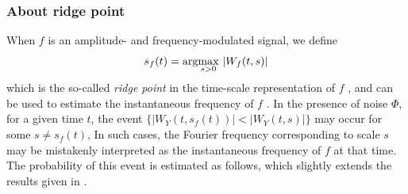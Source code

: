 \documentclass{amsart}
\begin{document}
\subsubsection{About ridge point}
When $f$ is an amplitude- and frequency-modulated signal, we define
\begin{equation*}
s_{f}(t) = \textup{arg}\underset{s>0}{\max}\ |W_{f}(t,s)|
\end{equation*}
which is the so-called {\em ridge point} in the time-scale representation of $f$ \cite{lilly2010analytic}, and
can be used to estimate the instantaneous frequency of $f$ \cite{delprat1992asymptotic}.
In the presence of noise $\Phi$, for a given time $t$, the event $\{|W_{Y}(t,s_{f}(t))|< |W_{Y}(t,s)|\}$ may occur for some $s\neq s_{f}(t)$,
In such cases, the Fourier frequency corresponding to scale $s$ may be mistakenly interpreted as the instantaneous frequency of $f$ at that time. The probability of this event is estimated as follows, which slightly extends the results given in \cite{liu2024analyzing}.
\end{document}
